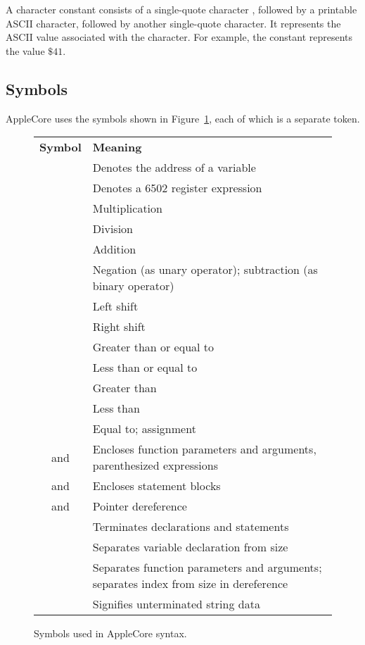 \documentclass[10pt]{article}
\begin{document}
 A character constant consists of a
single-quote character , followed by a printable ASCII
character, followed by another single-quote character.  It represents
the ASCII value associated with the character.  For example, the
constant  represents the value $\$41$.

\subsection{Symbols}

AppleCore uses the symbols shown in Figure~\ref{fig:symbols}, each of
which is a separate token.

\begin{figure}[th]
\begin{center}
\begin{tabular}{c l}
\textbf{Symbol} & \textbf{Meaning} \\
%
\kwd{@} & Denotes the address of a variable \\
%
\kwd{\^} & Denotes a 6502 register expression \\
\kwd{*}  & Multiplication \\
\kwd{/}  & Division \\
\kwd{+}  & Addition \\
\kwd{-}  & Negation (as unary operator); subtraction (as binary
operator) \\
\kwd{<<} & Left shift \\
\kwd{>>} & Right shift \\
\kwd{>=} & Greater than or equal to \\
\kwd{<=} & Less than or equal to \\
\kwd{>}  & Greater than \\
\kwd{<}  & Less than \\
\kwd{=}  & Equal to; assignment \\
\kwd{(} and \kwd{)} & Encloses function parameters and arguments, parenthesized expressions
\\
\kwd{\{} and \kwd{\}} & Encloses statement blocks \\
\kwd{[} and \kwd{]} & Pointer dereference \\
\kwd{;} & Terminates declarations and statements \\
\kwd{:} & Separates variable declaration from size \\
\kwd{,} & Separates function parameters and arguments; separates index from size in dereference \\
\kwd{\bs} & Signifies unterminated string data \\
\end{tabular}
\end{center}
\caption{Symbols used in AppleCore syntax.}
\label{fig:symbols}
\end{figure}
\end{document}
